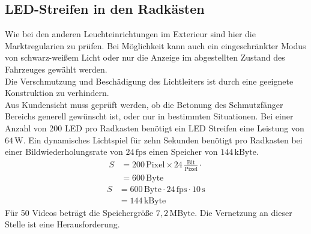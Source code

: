 \subsection{LED-Streifen in den Radkästen}
Wie bei den anderen Leuchteinrichtungen im Exterieur sind hier die Marktregularien zu prüfen. Bei Möglichkeit kann auch ein eingeschränkter Modus von schwarz-weißem Licht oder nur die Anzeige im abgestellten Zustand des Fahrzeuges gewählt werden. \\
Die Verschmutzung und Beschädigung des Lichtleiters ist durch eine geeignete Konstruktion zu verhindern. \\
Aus Kundensicht muss geprüft werden, ob die Betonung des Schmutzfänger Bereichs generell gewünscht ist, oder nur in bestimmten Situationen.
Bei einer Anzahl von 200 LED pro Radkasten benötigt ein LED Streifen eine Leistung von $ 64\,\mathrm{W} $.
Ein dynamisches Lichtspiel für zehn Sekunden benötigt pro Radkasten bei einer Bildwiederholungsrate von $ 24\,\mathrm{fps} $ einen Speicher von $ 144\,\mathrm{kByte}$. \\
\begin{align}
	S &= 200\,\mathrm{Pixel} \times 24\,\frac{\mathrm{Bit}}{\mathrm{Pixel}} \cdot \\
	&= 600\,\mathrm{Byte}
\end{align}
\begin{align}
	S &= 600\,\mathrm{Byte} \cdot 24\,\mathrm{fps} \cdot 10\,\mathrm{s}\\
	&= 144\,\mathrm{kByte}
\end{align}
Für 50 Videos beträgt die Speichergröße $ 7,2\,\mathrm{MByte} $.
Die Vernetzung an dieser Stelle ist eine Herausforderung.
